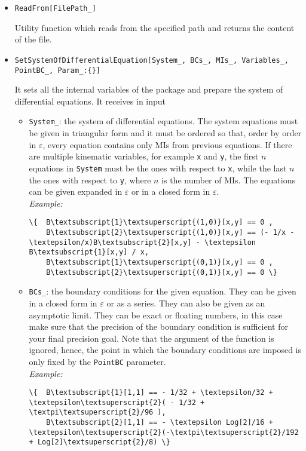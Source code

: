 \begin{itemize}
    \item \texttt{ReadFrom[FilePath\_]} 
    
    Utility function which reads from the specified path and returns the content of the file.
    
    \item \texttt{SetSystemOfDifferentialEquation[System\_, BCs\_, MIs\_, Variables\_, PointBC\_, Param\_:\{\}]}
    
    It sets all the internal variables of the package and prepare the system of differential equations. It receives in input
    \begin{itemize}
        \item \texttt{System\_}: the system of differential equations. The system equations must be given in triangular form and it must be ordered so that, order by order in $\varepsilon$, every equation contains only MIs from previous equations. If there are multiple kinematic variables, for example \texttt{x} and \texttt{y}, the first $n$ equations in \texttt{System} must be the ones with respect to \texttt{x}, while the last $n$ the ones with respect to \texttt{y}, where $n$ is the number of MIs. The equations can be given expanded in $\varepsilon$ or in a closed form in $\varepsilon$.\\
        \textit{Example:}
\begin{Verbatim}[commandchars=\\\{\}]
\{  B\textsubscript{1}\textsuperscript{(1,0)}[x,y] == 0 ,
    B\textsubscript{2}\textsuperscript{(1,0)}[x,y] == (- 1/x - \textepsilon/x)B\textsubscript{2}[x,y] - \textepsilon B\textsubscript{1}[x,y] / x,
    B\textsubscript{1}\textsuperscript{(0,1)}[x,y] == 0 ,
    B\textsubscript{2}\textsuperscript{(0,1)}[x,y] == 0 \}
\end{Verbatim}
        \item \texttt{BCs\_}: the boundary conditions for the given equation. They can be given in a closed form in $\varepsilon$ or as a series. They can also be given as an asymptotic limit. They can be exact or floating numbers, in this case make sure that the precision of the boundary condition is sufficient for your final precision goal. Note that the argument of the function is ignored, hence, the point in which the boundary conditions are imposed is only fixed by the \texttt{PointBC} parameter.
        \\
        \textit{Example:}
\begin{Verbatim}[commandchars=\\\{\}]
\{  B\textsubscript{1}[1,1] == - 1/32 + \textepsilon/32 + \textepsilon\textsuperscript{2}( - 1/32 + \textpi\textsuperscript{2}/96 ),
    B\textsubscript{2}[1,1] == - \textepsilon Log[2]/16 + \textepsilon\textsuperscript{2}(-\textpi\textsuperscript{2}/192 + Log[2]\textsuperscript{2}/8) \}
\end{Verbatim}
        

\end{itemize}
\end{itemize}

